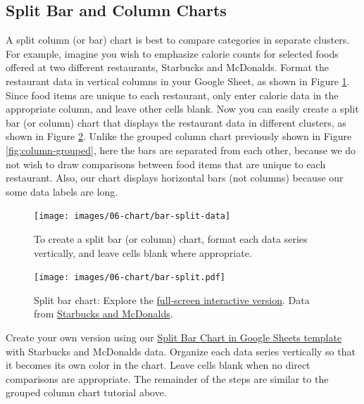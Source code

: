 \documentclass[
  english,
]{book}
\begin{document}
\hypertarget{split-bar-and-column-charts}{%
\subsection*{Split Bar and Column Charts}\label{split-bar-and-column-charts}}

A split column (or bar) chart is best to compare categories in separate clusters. For example, imagine you wish to emphasize calorie counts for selected foods offered at two different restaurants, Starbucks and McDonalds. Format the restaurant data in vertical columns in your Google Sheet, as shown in Figure \ref{fig:bar-split-data}. Since food items are unique to each restaurant, only enter calorie data in the appropriate column, and leave other cells blank. Now you can easily create a split bar (or column) chart that displays the restaurant data in different clusters, as shown in Figure \ref{fig:bar-split}. Unlike the grouped column chart previously shown in Figure \ref{fig:column-grouped}, here the bars are separated from each other, because we do not wish to draw comparisons between food items that are unique to each restaurant. Also, our chart displays horizontal bars (not columns) because our some data labels are long.



\begin{figure}
\texttt{[image: images/06-chart/bar-split-data]} \caption{To create a split bar (or column) chart, format each data series vertically, and leave cells blank where appropriate.}\label{fig:bar-split-data}
\end{figure}



\begin{figure}
\centering
\texttt{[image: images/06-chart/bar-split.pdf]}
\caption{\label{fig:bar-split}Split bar chart: Explore the \href{https://docs.google.com/spreadsheets/d/e/2PACX-1vSkvNNrgYCpNtsaCRxn7g5o4UR8OJXSxBWvUK531t5vYubt39gecV9yLIfic89DCeJnGNvpRttFfKzn/pubchart?oid=787918829\&format=interactive}{full-screen interactive version}. Data from \href{https://docs.google.com/spreadsheets/d/1LGUYaVLoRcOiB8KcXb3Rn7LRj0exnUQYOy58LrkGPAk/edit\#gid=956322126}{Starbucks and McDonalds}.}
\end{figure}

Create your own version using our \href{https://docs.google.com/spreadsheets/d/1LGUYaVLoRcOiB8KcXb3Rn7LRj0exnUQYOy58LrkGPAk/}{Split Bar Chart in Google Sheets template} with Starbucks and McDonalds data. Organize each data series vertically so that it becomes its own color in the chart. Leave cells blank when no direct comparisons are appropriate. The remainder of the steps are similar to the grouped column chart tutorial above.
\end{document}
